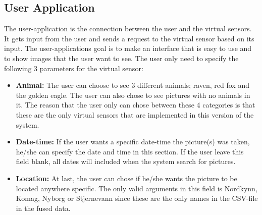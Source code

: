 \documentclass[USenglish]{uit-thesis}
\begin{document}
\subsection{User Application} \label{ssec:des_user}
The user-application is the connection between the user and the virtual sensors. It gets input from the user and sends a request to the virtual sensor based on its input. The user-applications goal is to make an interface that is easy to use and to show images that the user want to see.
The user only need to specify the following 3 parameters for the virtual sensor:

\begin{itemize}
\item \textbf{Animal:} The user can choose to see 3 different animals; raven, red fox and the golden eagle. The user can also chose to see pictures with no animals in it. The reason that the user only can chose between these 4 categories is that these are the only virtual sensors that are implemented in this version of the system.

\item \textbf{Date-time:} If the user wants a specific date-time the picture(s) was taken, he/she can specify the date and time in this section. If the user leave this field blank, all dates will included when the system search for pictures.

\item \textbf{Location:} At last, the user can chose if he/she wants the picture to be located anywhere specific. The only valid arguments in this field is Nordkynn, Komag, Nyborg or Stjernevann since these are the only names in the CSV-file in the fused data.
\end{itemize}
\end{document}
